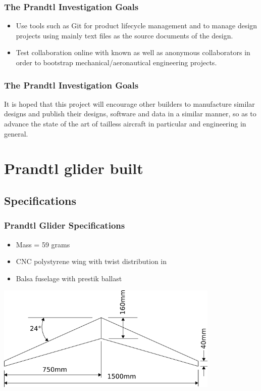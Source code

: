 \documentclass{beamer}
\begin{document}
\begin{frame}
\frametitle{The Prandtl Investigation Goals}

\begin{itemize}
\item Use tools such as Git for product lifecycle management and to manage design projects using mainly text files as the source documents of the design.
\item Test collaboration online with known as well as anonymous collaborators in order to bootstrap mechanical/aeronautical engineering projects.
\end{itemize}

\end{frame}


\begin{frame}
\frametitle{The Prandtl Investigation Goals}

It is hoped that this project will encourage other builders to manufacture similar designs and publish their designs, software and data in a similar manner, so as to advance the state of the art of tailless aircraft in particular and engineering in general.



\end{frame}



\section{Prandtl glider built}


\subsection{Specifications}

\begin{frame}
\frametitle{Prandtl Glider Specifications}

\begin{itemize}
\item Mass = 59 grams
\item CNC polystyrene wing with twist distribution in \cite{PrandtlBowers}
\item Balsa fuselage with prestik ballast
\end{itemize}

\includegraphics[width = 0.8\textwidth]{Pictures/P1Planform.png}

\end{frame}
\end{document}
